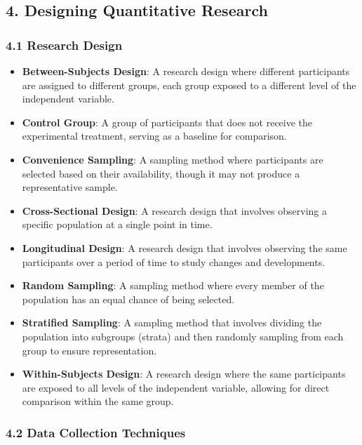\documentclass[
]{book}
\providecommand{\tightlist}{%
  \setlength{\itemsep}{0pt}\setlength{\parskip}{0pt}}
\begin{document}
\subsection*{\texorpdfstring{4. \textbf{Designing Quantitative Research}}{4. Designing Quantitative Research}}\label{designing-quantitative-research-1}

\subsubsection*{\texorpdfstring{\textbf{4.1 Research Design}}{4.1 Research Design}}\label{research-design-1}

\begin{itemize}
\tightlist
\item
  \textbf{Between-Subjects Design}: A research design where different participants are assigned to different groups, each group exposed to a different level of the independent variable.
\item
  \textbf{Control Group}: A group of participants that does not receive the experimental treatment, serving as a baseline for comparison.
\item
  \textbf{Convenience Sampling}: A sampling method where participants are selected based on their availability, though it may not produce a representative sample.
\item
  \textbf{Cross-Sectional Design}: A research design that involves observing a specific population at a single point in time.
\item
  \textbf{Longitudinal Design}: A research design that involves observing the same participants over a period of time to study changes and developments.
\item
  \textbf{Random Sampling}: A sampling method where every member of the population has an equal chance of being selected.
\item
  \textbf{Stratified Sampling}: A sampling method that involves dividing the population into subgroups (strata) and then randomly sampling from each group to ensure representation.
\item
  \textbf{Within-Subjects Design}: A research design where the same participants are exposed to all levels of the independent variable, allowing for direct comparison within the same group.
\end{itemize}

\subsubsection*{\texorpdfstring{\textbf{4.2 Data Collection Techniques}}{4.2 Data Collection Techniques}}\label{data-collection-techniques-1}
\end{document}
